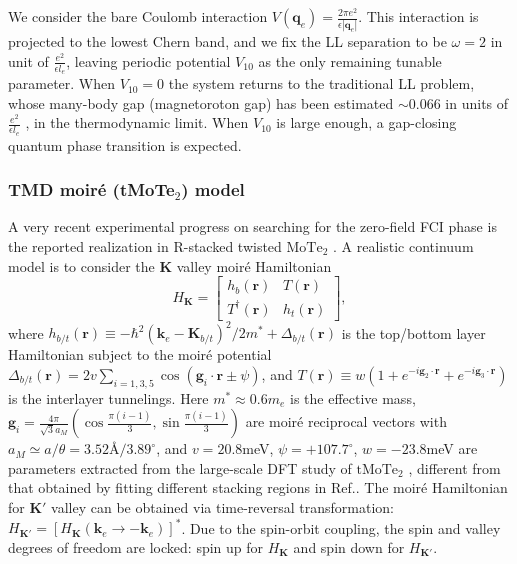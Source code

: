 We consider the bare Coulomb interaction $V(\mathbf{q}_e)=\frac{2\pi e^2}{\epsilon |\mathbf{q}_e|}$. This interaction is projected to the lowest Chern band, and we fix the LL separation to be $\omega=2$ in unit of $\frac{e^2}{\epsilon l_e}$, leaving periodic potential $V_{10}$ as the only remaining tunable parameter. When $V_{10}=0$ the system returns to the traditional LL problem, whose many-body gap (magnetoroton gap) has been estimated $\sim 0.066$ in units of $\frac{e^2}{\epsilon l_e}$ \cite{balram2017positions}, in the thermodynamic limit. When $V_{10}$ is large enough, a gap-closing quantum phase transition is expected.


\subsubsection{TMD moiré (tMoTe$_2$) model}
A very recent experimental progress on searching for the zero-field FCI phase is the reported realization in R-stacked twisted $\mathrm{MoTe_2}$ \cite{cai2023signatures,zeng2023thermodynamic,park2023observation}. A realistic continuum model is to consider the $\mathbf{K}$ valley moir\'e Hamiltonian \cite{wu2019topological,wang2023fractional}
\begin{equation}\label{eq: tMoTe2 moiré Hamiltonian}
    H_\mathbf{K}=\begin{bmatrix}
        h_b(\bm r) & T(\bm r)\\
        T^\dagger(\bm r) & h_t(\bm r)
    \end{bmatrix},
\end{equation}
where $h_{b/t}(\bm r)\equiv-\hbar^2(\mathbf k_e-\mathbf K_{b/t})^2/2m^*+\Delta_{b/t}(\bm r)$ is the top/bottom layer Hamiltonian subject to the moir\'e potential $\Delta_{b/t}(\bm r)=2v\sum_{i=1,3,5}\cos(\mathbf g_i\cdot\bm r\pm\psi)$, and $T(\bm r)\equiv w(1+e^{-i\mathbf g_2\cdot\bm r}+e^{-i\mathbf g_3\cdot\bm r})$ is the interlayer tunnelings. Here $m^*\approx0.6m_e$ is the effective mass, $\mathbf g_i=\frac{4\pi}{\sqrt{3}a_M}(\cos\frac{\pi(i-1)}{3}, \sin\frac{\pi(i-1)}{3})$ are moir\'e reciprocal vectors with $a_M\simeq a/\theta=3.52\text{\AA}/3.89^\circ$, and $v=20.8$meV, $\psi=+107.7^\circ$, $w=-23.8$meV are parameters extracted from the large-scale DFT study of $\mathrm{tMoTe_2}$ \cite{wang2023fractional}, different from that obtained by fitting different stacking regions in Ref.\cite{wu2019topological}. The moir\'e Hamiltonian for $\mathbf{K'}$ valley can be obtained via time-reversal transformation: $H_{\mathbf{K'}}=[H_\mathbf{K}(\mathbf k_e\rightarrow -\mathbf k_e)]^*$. Due to the spin-orbit coupling, the spin and valley degrees of freedom are locked: spin up for $H_\mathbf{K}$ and spin down for $H_{\mathbf{K'}}$. 



